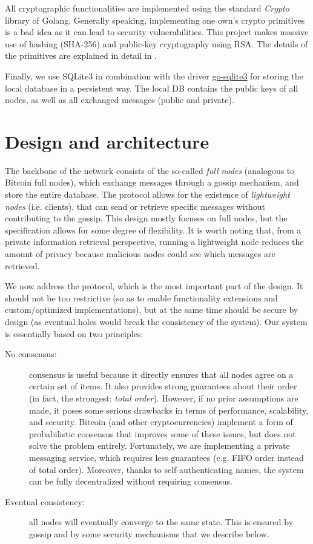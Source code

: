 \documentclass[a4paper,12pt]{article}
\begin{document}
All cryptographic functionalities are implemented using the standard \emph{Crypto} library of Golang. Generally speaking, implementing one own's crypto primitives is a bad idea as it can lead to security vulnerabilities. This project makes massive use of hashing (SHA-256) and public-key cryptography using RSA. The details of the primitives are explained in detail in .

Finally, we use SQLite3 in combination with the driver \href{https://github.com/mattn/go-sqlite3}{go-sqlite3} for storing the local database in a persistent way. The local DB contains the public keys of all nodes, as well as all exchanged messages (public and private). 

\section{Design and architecture} %
\label{sec:design}
The backbone of the network consists of the so-called \emph{full nodes} (analogous to Bitcoin full nodes), which exchange messages through a gossip mechanism, and store the entire database. The protocol allows for the existence of \emph{lightweight nodes} (i.e. clients), that can send or retrieve specific messages without contributing to the gossip. This design mostly focuses on full nodes, but the specification allows for some degree of flexibility. It is worth noting that, from a private information retrieval perspective, running a lightweight node reduces the amount of privacy because malicious nodes could see which messages are retrieved.

We now address the protocol, which is the most important part of the design. It should not be too restrictive (so as to enable functionality extensions and custom/optimized implementations), but at the same time should be secure by design (as eventual holes would break the consistency of the system). Our system is essentially based on two principles:
\begin{description}
	\item[No consensus:] consensus is useful because it directly ensures that all nodes agree on a certain set of items. It also provides strong guarantees about their order (in fact, the strongest: \emph{total order}). However, if no prior assumptions are made, it poses some serious drawbacks in terms of performance, scalability, and security.  Bitcoin (and other cryptocurrencies) implement a form of probabilistic consensus that improves some of these issues, but does not solve the problem entirely. Fortunately, we are implementing a private messaging service, which requires less guarantees (e.g. FIFO order instead of total order). Moreover, thanks to self-authenticating names, the system can be fully decentralized without requiring consensus.
	\item[Eventual consistency:] all nodes will eventually converge to the same state. This is ensured by gossip and by some security mechanisms that we describe below.
\end{description}
\end{document}
